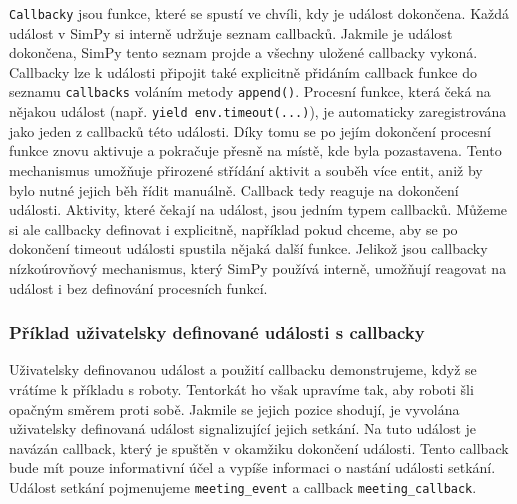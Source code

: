 \documentclass[12pt,a4paper]{article}
\begin{document}
\texttt{Callbacky} jsou funkce, které se spustí ve chvíli, kdy je událost dokončena. Každá událost v SimPy si interně udržuje seznam callbacků. Jakmile je událost dokončena, SimPy tento seznam projde a všechny uložené callbacky vykoná. Callbacky lze k události připojit také explicitně přidáním callback funkce do seznamu \texttt{callbacks} voláním metody \texttt{append()}. Procesní funkce, která čeká na nějakou událost (např. \texttt{yield env.timeout(...)}), je automaticky zaregistrována jako jeden z callbacků této události. Díky tomu se po jejím dokončení procesní funkce znovu aktivuje a pokračuje přesně na místě, kde byla pozastavena. Tento mechanismus umožňuje přirozené střídání aktivit a souběh více entit, aniž by bylo nutné jejich běh řídit manuálně. Callback tedy reaguje na dokončení události. Aktivity, které čekají na událost, jsou jedním typem callbacků. Můžeme si ale callbacky definovat i explicitně, například pokud chceme, aby se po dokončení timeout události spustila nějaká další funkce. Jelikož jsou callbacky nízkoúrovňový mechanismus, který SimPy používá interně, umožňují reagovat na událost i bez definování procesních funkcí.

\subsubsection{Příklad uživatelsky definované události s callbacky}
Uživatelsky definovanou událost a použití callbacku demonstrujeme, když se vrátíme k příkladu s roboty. Tentorkát ho však upravíme tak, aby roboti šli opačným směrem proti sobě. Jakmile se jejich pozice shodují, je vyvolána uživatelsky definovaná událost signalizující jejich setkání. Na tuto událost je navázán callback, který je spuštěn v okamžiku dokončení události. Tento callback bude mít pouze informativní účel a vypíše informaci o nastání události setkání. Událost setkání pojmenujeme \texttt{meeting\_event} a callback \texttt{meeting\_callback}. 
\end{document}
